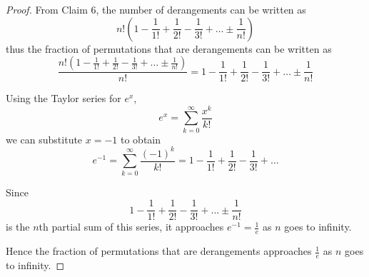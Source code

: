 \documentclass{article}
\begin{document}
\begin{proof}
    From Claim 6, the number of derangements can be written as
    \[
    n!\left(1 - \frac{1}{1!} + \frac{1}{2!} - \frac{1}{3!} + \dots \pm \frac{1}{n!}\right)
    \]
    thus the fraction of permutations that are derangements can be written as
    \[
    \frac{n!\left(1 - \frac{1}{1!} + \frac{1}{2!} - \frac{1}{3!} + \dots \pm \frac{1}{n!}\right)}{n!}
    = 1 - \frac{1}{1!} + \frac{1}{2!} - \frac{1}{3!} + \dots \pm \frac{1}{n!}
    \]

    \medskip

    Using the Taylor series for $e^x$,
    \[
    e^x = \sum_{k=0}^{\infty} \frac{x^k}{k!}
    \]
    we can substitute $x = -1$ to obtain
    \[
    e^{-1} = \sum_{k=0}^{\infty} \frac{(-1)^k}{k!} = 1 - \frac{1}{1!} + \frac{1}{2!} - \frac{1}{3!} + \dots
    \]
    
    \medskip
    
    Since
    \[
    1 - \frac{1}{1!} + \frac{1}{2!} - \frac{1}{3!} + \dots \pm \frac{1}{n!}
    \]
    is the $n$th partial sum of this series, it approaches $e^{-1} = \frac{1}{e}$ as $n$ goes to infinity.

    \medskip

    Hence the fraction of permutations that are derangements approaches $\frac{1}{e}$ as $n$ goes to infinity.
\end{proof}
\end{document}
